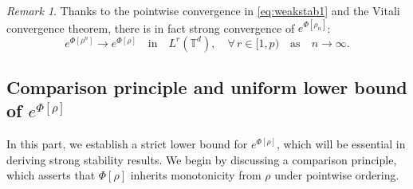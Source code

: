 \documentclass[11pt,reqno,a4paper]{amsart}
\theoremstyle{definition}
\theoremstyle{remark}
\newtheorem{remark}[lemma]{Remark}
\numberwithin{equation}{section}
\newcommand{\T} {\mathbb T}
\begin{document}
\begin{remark}\label{rmk:strcexp}
Thanks to the pointwise convergence in \eqref{eq:weakstab1} and the Vitali convergence theorem, there is in fact strong convergence of $e^{\Phi[\rho_n]}$:
\[
e^{\Phi[\rho^n]} \to e^{\Phi[\rho]} \quad\text{in}\quad L^r (\T^d),\quad \forall \, r \in [1,p) \quad \mbox{as} \quad n \to \infty.
\]
\end{remark}

%
%
%
%
%

\subsection{Comparison principle and uniform lower bound of $e^{\Phi[\rho]}$}

In this part, we establish a strict lower bound for $e^{\Phi[\rho]}$, which will be essential in deriving strong stability results. We begin by discussing a comparison principle, which asserts that $\Phi[\rho]$ inherits monotonicity from $\rho$ under pointwise ordering.
\end{document}
